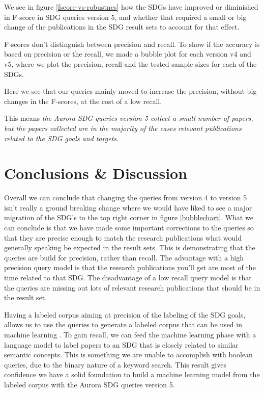 \documentclass{article}
\begin{document}
We see in figure \ref{fscore-vs-robustnes} how the SDGs have improved or diminished in F-score in SDG queries version 5, and whether that required a small or big change of the publications in the SDG result sets to account for that effect.

F-scores don't distinguish between precision and recall. To show if the accuracy is based on precision or the recall, we made a bubble plot for each version v4 and v5, where we plot the precision, recall and the tested sample sizes for each of the SDGs. 

Here we see that our queries mainly moved to increase the precision, without big changes in the F-scores, at the cost of a low recall.

This means \emph{the Aurora SDG queries version 5 collect a small number of papers, but the papers collected are in the majority of the cases relevant publications related to the SDG goals and targets.}

\section{Conclusions \& Discussion}
Overall we can conclude that changing the queries from version 4 to version 5 isn't really a ground breaking change where we would have liked to see a major migration of the SDG's to the top right corner in figure \ref{bubblechart}. What we can conclude is that we have made some important corrections to the queries so that they are precise enough to match the research publications what would generally speaking be expected in the result sets. This is demonstrating that the queries are build for precision, rather than recall. The advantage with a high precision query model is that the research publications you'll get are most of the time related to that SDG. The disadvantage of a low recall query model is that the queries are missing out lots of relevant research publications that should be in the result set.

Having a labeled corpus aiming at precision of the labeling of the SDG goals, allows us to use the queries to generate a labeled corpus that can be used in machine learning \cite{zhang_matching_2020}.  To gain recall, we can feed the machine learning phase with a language model to label papers to an SDG that is closely related to similar semantic concepts. This is something we are unable to accomplish with boolean queries, due to the binary nature of a keyword search. This result gives confidence we have a solid foundation to build a machine learning model from the labeled corpus with the Aurora SDG queries version 5. 
\end{document}
